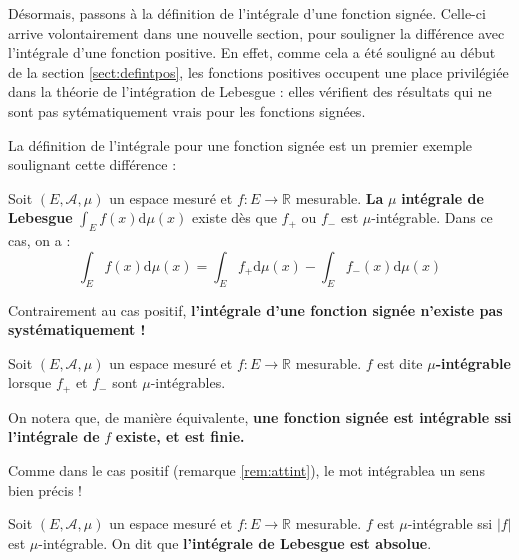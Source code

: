 \documentclass[../integ-proba.tex]{subfiles}
\begin{document}
  Désormais, passons à la définition de l'intégrale d'une fonction signée. Celle-ci arrive volontairement dans une nouvelle section, pour souligner la différence avec l'intégrale d'une fonction positive.
  En effet, comme cela a été souligné au début de la section \ref{sect:defintpos}, les fonctions positives occupent une place privilégiée dans la théorie de l'intégration de Lebesgue : elles vérifient des résultats qui ne sont pas sytématiquement vrais pour les fonctions signées.

  La définition de l'intégrale pour une fonction signée est un premier exemple soulignant cette différence :

  \begin{defi}
    Soit $\left(E,\mathcal{A},\mu\right)$ un espace mesuré et $f:E\rightarrow\mathbb{R}$ mesurable.
    \textbf{La} $\mu$ \textbf{intégrale de Lebesgue} $\displaystyle\int_E f(x) \text{d}\mu(x)$ existe dès que $f_+$ ou $f_-$ est $\mu$-intégrable.
    Dans ce cas, on a :
    $$
    \int_E f(x) \text{d}\mu(x)=\int_Ef_+\text{d}\mu(x) - \int_Ef_-(x)\text{d}\mu(x)
    $$
  \end{defi}

  \begin{rem}
    Contrairement au cas positif, \textbf{l'intégrale d'une fonction signée n'existe pas systématiquement !}
  \end{rem}

  \begin{defi}
    Soit $\left(E,\mathcal{A},\mu\right)$ un espace mesuré et $f:E\rightarrow\mathbb{R}$ mesurable.
    $f$ est dite $\mu$\textbf{-intégrable} lorsque $f_+$ et $f_-$ sont $\mu$-intégrables.
  \end{defi}

  \begin{rem}
    On notera que, de manière équivalente, \textbf{une fonction signée est intégrable ssi l'intégrale de} $f$ \textbf{existe, et est finie.}
  \end{rem}

  \begin{rem}
    Comme dans le cas positif (remarque \ref{rem:attint}), le mot \og intégrable\fg a un sens bien précis !
  \end{rem}

  \begin{thm}
    Soit $\left(E, \mathcal{A}, \mu\right)$ un espace mesuré et $f:E\longrightarrow\mathbb{R}$ mesurable. $f$ est $\mu$-intégrable ssi $\left|f\right|$ est $\mu$-intégrable.
    On dit que \textbf{l'intégrale de Lebesgue est absolue}.
  \end{thm}
\end{document}
